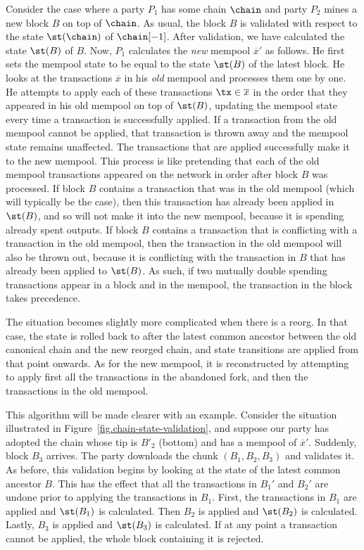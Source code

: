 Consider the case where a party $P_1$ has some chain $\chain$ and party $P_2$ mines a new
block $B$ on top of $\chain$. As usual, the block $B$ is validated with respect to the state
$\st(\chain)$ of $\chain[-1]$. After validation, we have calculated the state $\st(B)$ of $B$.
Now, $P_1$ calculates the \emph{new} mempool $\overline{x}'$ as follows.
He first sets the mempool state to be equal to the state $\st(B)$ of the latest block.
He looks at the transactions $\overline{x}$ in his \emph{old} mempool and processes them
one by one. He attempts to apply each of these transactions $\tx \in \overline{x}$ in the
order that they appeared in his old mempool on top of $\st(B)$, updating the mempool state every time
a transaction is successfully applied. If a transaction from the old mempool
cannot be applied, that transaction is thrown away and the mempool state remains unaffected.
The transactions that are applied successfully
make it to the new mempool. This process is like pretending that each of the old mempool transactions
appeared on the network in order after block $B$ was processed. If block $B$ contains a transaction
that was in the old mempool (which will typically be the case), then this transaction has already
been applied in $\st(B)$, and so will not make it into the new mempool, because it is spending already
spent outputs. If block $B$ contains a transaction that is conflicting with a transaction
in the old mempool, then the transaction in the old mempool will also be thrown out, because it
is conflicting with the transaction in $B$ that has already been applied to $\st(B)$.
As such, if two mutually double spending transactions appear in a block and in the mempool,
the transaction in the block takes precedence.

The situation becomes slightly more complicated when there is a reorg. In that case, the
state is rolled back to after the latest common ancestor between the old canonical chain and
the new reorged chain, and state transitions are applied from that point onwards. As for the
new mempool, it is reconstructed by attempting to apply first all the transactions in the
abandoned fork, and then the transactions in the old mempool.

This algorithm will be made clearer with an example. Consider the situation illustrated in
Figure~\ref{fig.chain-state-validation}, and suppose our party has adopted the chain
whose tip is $B'_2$ (bottom) and has a mempool of $\overline{x}'$. Suddenly, block $B_3$
arrives. The party downloads the chunk $(B_1, B_2, B_3)$ and validates it. As before,
this validation begins by looking at the state of the latest common ancestor $B$.
This has the effect that all the transactions in $B_1'$ and $B_2'$ are undone
prior to applying the transactions in $B_1$.
First, the transactions in $B_1$ are applied and $\st(B_1)$ is calculated. Then
$B_2$ is applied and $\st(B_2)$ is calculated. Lastly, $B_3$ is applied and $\st(B_3)$
is calculated. If at any point a transaction cannot be applied, the whole block containing
it is rejected.

